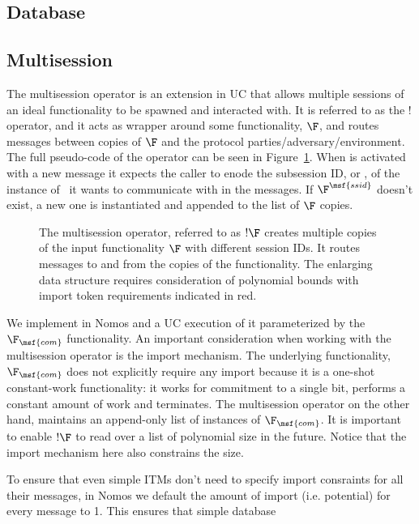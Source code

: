 \subsection{Database}

\subsection{Multisession}
The multisession operator is an extension in UC that allows multiple sessions of an ideal functionality to be spawned and interacted with.
It is referred to as the $!$ operator, and it acts as wrapper around some functionality, $\F$, and routes messages between copies of $\F$ and the protocol parties/adversary/environment.
The full pseudo-code of the operator can be seen in Figure~\ref{fig:bangf}.
When \bangf is activated with a new message it expects the caller to enode the subsession ID, or , of the instance of \F~it wants to communicate with in the messages.
If $\F^{\msf{ssid}}$ doesn't exist, a new one is instantiated and appended to the list of $\F$ copies.

\begin{figure}

\caption{The multisession operator, referred to as $!\F$ creates multiple copies of the input functionality $\F$ with different session IDs. It routes messages to and from the copies of the functionality. The enlarging data structure  requires consideration of polynomial bounds with import token requirements indicated in \color{red} red\color{black}.}
\label{fig:bangf}
\end{figure}

We implement \bangf in Nomos and a UC execution of it parameterized by the $\F_{\msf{com}}$ functionality. 
An important consideration when working with the multisession operator is the import mechanism.
The underlying functionality, $\F_{\msf{com}}$ does not explicitly require any import because it is a one-shot constant-work functionality: it works for commitment to a single bit, performs a constant amount of work and terminates.
The multisession operator on the other hand, maintains an append-only list of instances of $\F_{\msf{com}}$.
It is important to enable $!\F$ to read over a list of polynomial size in the future.
Notice that the import mechanism here also constrains the size.

To ensure that even simple ITMs don't need to specify import consraints for all their messages, in Nomos we default the amount of import (i.e. potential) for every message to 1.
This ensures that simple database 

